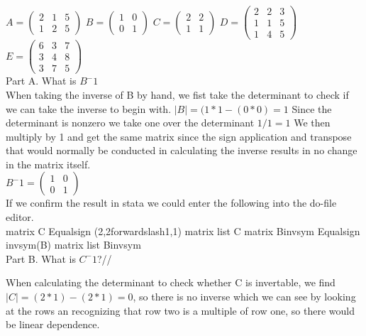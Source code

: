 \documentclass{article}
\begin{document}
$A = \left( \begin{smallmatrix} 2&1&5\\ 1&2&5 \end{smallmatrix} \right)$
$B = \left( \begin{smallmatrix} 1&0\\0&1 \end{smallmatrix} \right)$
$C = \left( \begin{smallmatrix} 2&2\\1&1 \end{smallmatrix} \right)$
$D = \left( \begin{smallmatrix} 2&2&3\\1&1&5\\1&4&5 \end{smallmatrix} \right)$
$E = \left( \begin{smallmatrix} 6&3&7\\3&4&8\\3&7&5 \end{smallmatrix} \right)$\\

Part A. What is $B^-1$\\
	
When taking the inverse of B by hand, we fist take the determinant to check if we can take the inverse to begin with. $|B|=(1*1-(0*0)=1$ Since the determinant is nonzero we take one over the determinant $1/1=1$ We then multiply by 1 and get the same matrix since the sign application and transpose that would normally be conducted in calculating the inverse results in no change in the matrix itself.\\

$B^-1=\left( \begin{smallmatrix} 1&0\\0&1 \end{smallmatrix} \right)$\\

If we confirm the result in stata we could enter the following into the do-file editor.\\

matrix C Equalsign (2,2forwardslash1,1)
matrix list C
matrix Binvsym Equalsign invsym(B)
matrix list Binvsym\\

Part B. What is $C^-1$?//

When calculating the determinant to check whether C is invertable, we find $|C|= (2*1)-(2*1)=0$, so there is no inverse which we can see by looking at the rows an recognizing that row two is a multiple of row one, so there would be linear dependence.\\
\end{document}
